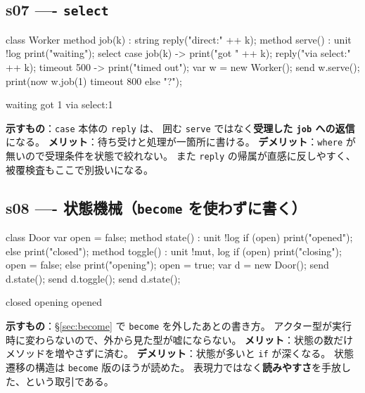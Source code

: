 \documentclass[11pt,a4paper]{ltjsarticle}
\theoremstyle{definition}
\theoremstyle{remark}
\begin{document}
\subsection{s07 ---- \texttt{select}}
\begin{aipl}
class Worker {
  method job(k) : string { reply("direct:" ++ k); }
  method serve() : unit !{log} {
    print("waiting");
    select {
      case job(k) -> { print("got " ++ k); reply("via select:" ++ k); }
      timeout 500 -> { print("timed out"); }
    }
  }
}
var w = new Worker();
send w.serve();
print(now w.job(1) timeout 800 else "?");
\end{aipl}
\begin{term}
waiting
got 1
via select:1
\end{term}
\textbf{示すもの}：\texttt{case} 本体の \texttt{reply} は、
囲む \texttt{serve} ではなく\textbf{受理した \texttt{job} への返信}になる。
\textbf{メリット}：待ち受けと処理が一箇所に書ける。
\textbf{デメリット}：\texttt{where} が無いので受理条件を状態で絞れない。
また \texttt{reply} の帰属が直感に反しやすく、被覆検査もここで別扱いになる。

\subsection{s08 ---- 状態機械（\texttt{become} を使わずに書く）}
\begin{aipl}
class Door {
  var open = false;
  method state() : unit !{log} {
    if (open) { print("opened"); } else { print("closed"); }
  }
  method toggle() : unit !{mut, log} {
    if (open) { print("closing"); open = false; }
    else      { print("opening"); open = true; }
  }
}
var d = new Door();
send d.state();
send d.toggle();
send d.state();
\end{aipl}
\begin{term}
closed
opening
opened
\end{term}
\textbf{示すもの}：\S\ref{sec:become} で \texttt{become} を外したあとの書き方。
アクター型が実行時に変わらないので、外から見た型が嘘にならない。
\textbf{メリット}：状態の数だけメソッドを増やさずに済む。
\textbf{デメリット}：状態が多いと \texttt{if} が深くなる。
状態遷移の構造は \texttt{become} 版のほうが読めた。
表現力ではなく\textbf{読みやすさ}を手放した、という取引である。
\end{document}
